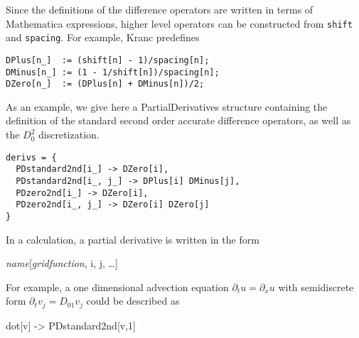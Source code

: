 \documentclass{report}
\begin{document}
Since the definitions of the difference operators are written in terms
of Mathematica expressions, higher level operators can be constructed
from {\tt shift} and {\tt spacing}.  For example, Kranc predefines

\begin{center}
\begin{minipage}{0.8 \textwidth}
\begin{verbatim}
DPlus[n_]  := (shift[n] - 1)/spacing[n];
DMinus[n_] := (1 - 1/shift[n])/spacing[n];
DZero[n_]  := (DPlus[n] + DMinus[n])/2;
\end{verbatim}
\end{minipage}
\end{center}

As an example, we give here a PartialDerivatives structure containing
the definition of the standard second order accurate difference
operators, as well as the $D_0^2$ discretization.

\begin{center}
\begin{minipage}{0.8 \textwidth}
\begin{verbatim}
derivs = {
  PDstandard2nd[i_] -> DZero[i],
  PDstandard2nd[i_, j_] -> DPlus[i] DMinus[j],
  PDzero2nd[i_] -> DZero[i],
  PDzero2nd[i_, j_] -> DZero[i] DZero[j]
}
\end{verbatim}
\end{minipage}
\end{center}

In a calculation, a partial derivative is written in the form

\begin{center}
\begin{minipage}{0.8 \textwidth}
\begin{tt}
{\it name}[{\it gridfunction}, i, j, \ldots]
\end{tt}
\end{minipage}
\end{center}

For example, a one dimensional advection equation $\partial_t u =
\partial_x u$ with semidiscrete form $\partial_t v_j = D_{01} v_j$
could be described as

\begin{center}
\begin{minipage}{0.8 \textwidth}
\begin{tt}
dot[v] -> PDstandard2nd[v,1]
\end{tt}
\end{minipage}
\end{center}
\end{document}
